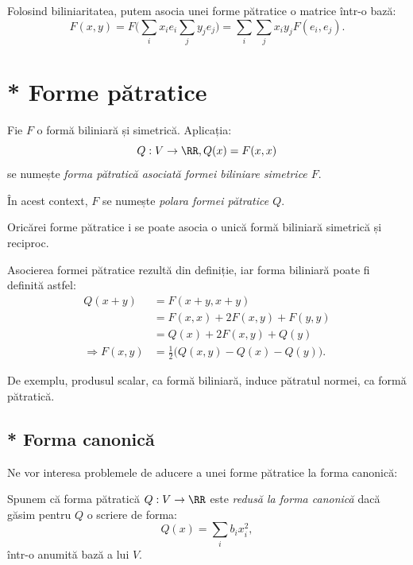 Folosind biliniaritatea, putem asocia unei forme pătratice o matrice într-o bază:
\[
  F(x, y) = F \Big( \sum_i x_i e_i \sum_j y_j e_j \Big) = %
  \sum_i \sum_j x_i y_j F(e_i, e_j).
\]


\section{* Forme pătratice}
\label{sec:f-patr}

\begin{definition}\label{def:f-patr}
  Fie $F$ o formă biliniară și simetrică. Aplicația:
  \[
    Q : V \to \RR, Q(x) = F(x, x)
  \]
  se numește \emph{forma pătratică asociată formei biliniare simetrice $F$}.

  În acest context, $F$ se numește \emph{polara formei pătratice $Q$}.
\end{definition}

\begin{remark}\label{rk:patr-bil}
  Oricărei forme pătratice i se poate asocia o unică formă biliniară simetrică
  și reciproc.
\end{remark}

Asocierea formei pătratice rezultă din definiție, iar forma biliniară poate fi
definită astfel:
\begin{align*}
  Q(x + y) &= F(x + y, x + y) \\
           &= F(x, x) + 2F(x, y) + F(y, y) \\
           &= Q(x) + 2F(x, y) + Q(y) \\
  \Rightarrow F(x, y) &= \frac{1}{2} \big( Q(x, y) - Q(x) - Q(y) \big).
\end{align*}

De exemplu, produsul scalar, ca formă biliniară, induce pătratul normei, ca formă pătratică.


\subsection{* Forma canonică}
\label{subsec:f-can}

Ne vor interesa problemele de aducere a unei forme pătratice la forma canonică:

\begin{definition}\label{def:f-can-patr}
  Spunem că forma pătratică $Q : V \to \RR$ este \emph{redusă la forma canonică}
  dacă găsim pentru $Q$ o scriere de forma:
  \[
    Q(x) = \sum_i b_i x_i^2,
  \]
  într-o anumită bază a lui $V$.
\end{definition}

